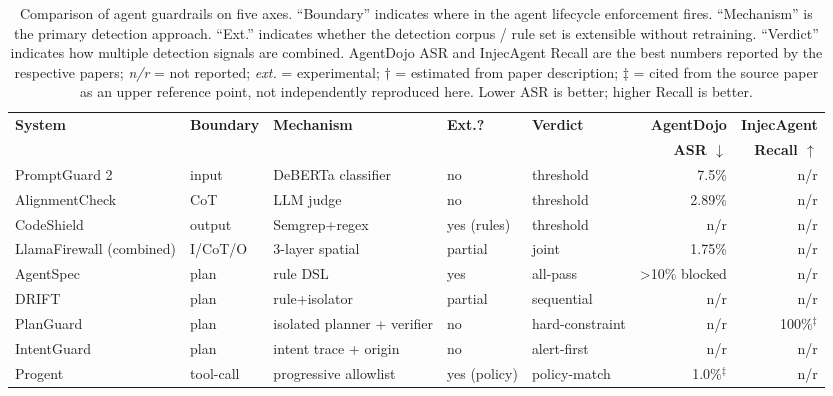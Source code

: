 \documentclass[sigconf,anonymous,review]{acmart}
\begin{document}
\begin{table}[tp]
\centering
\caption{%
  Comparison of agent guardrails on five axes. ``Boundary'' indicates where in
  the agent lifecycle enforcement fires. ``Mechanism'' is the primary detection
  approach. ``Ext.'' indicates whether the detection corpus / rule set is
  extensible without retraining. ``Verdict'' indicates how multiple detection
  signals are combined. AgentDojo ASR and InjecAgent Recall are the best
  numbers reported by the respective papers; {\em n/r} = not reported;
  {\em ext.} = experimental; $\dagger$ = estimated from paper description;
  $\ddagger$ = cited from the source paper as an upper reference point, not
  independently reproduced here.
  Lower ASR is better; higher Recall is better.
}
\label{tab:guardrail-comparison}
\small
\begin{tabular}{@{}lllllrr@{}}
\toprule
\textbf{System} & \textbf{Boundary} & \textbf{Mechanism} &
\textbf{Ext.?} & \textbf{Verdict} &
\textbf{AgentDojo} & \textbf{InjecAgent} \\
& & & & & \textbf{ASR $\downarrow$} & \textbf{Recall $\uparrow$} \\
\midrule

PromptGuard 2 & input & DeBERTa classifier & no & threshold & 7.5\% & n/r \\
AlignmentCheck & CoT & LLM judge & no & threshold & 2.89\% & n/r \\
CodeShield & output & Semgrep+regex & yes (rules) & threshold & n/r & n/r \\
LlamaFirewall (combined) & I/CoT/O & 3-layer spatial & partial & joint & 1.75\% & n/r \\
\midrule

AgentSpec & plan & rule DSL & yes & all-pass & >10\% blocked & n/r \\
DRIFT & plan & rule+isolator & partial & sequential & n/r & n/r \\
PlanGuard & plan & isolated planner + verifier & no & hard-constraint & n/r & 100\%$^\ddagger$ \\
IntentGuard & plan & intent trace + origin & no & alert-first & n/r & n/r \\
Progent & tool-call & progressive allowlist & yes (policy) & policy-match & 1.0\%$^\ddagger$ & n/r \\
\midrule


\end{tabular}
\end{table}
\end{document}
